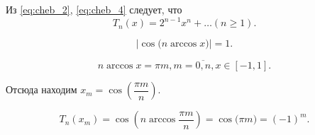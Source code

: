 Из \eqref{eq:cheb_2}, \eqref{eq:cheb_4} следует, что
\begin{equation*}
  T_n (x) = 2^{n-1} x^n + \ldots (n \geqslant 1).
\end{equation*}

\begin{equation*}
  \left| \cos \Big( n \arccos x \Big) \right| = 1.
\end{equation*}

\begin{equation*}
  n \arccos x = \pi m, m = \overline{0, n}, x \in [-1, 1].
\end{equation*}

Отсюда находим $x_m = \cos \left( \dfrac{\pi m}{n} \right)$.

\begin{equation*}
  T_n (x_m) = \cos \left( n \arccos \dfrac{\pi m}{n} \right) = \cos \Big( \pi m \Big) = (-1)^m.
\end{equation*}
